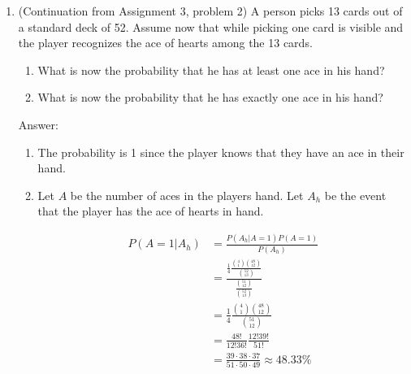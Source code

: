 \documentclass{article}
\begin{document}
\begin{enumerate}
\begin{enumerate}
\end{enumerate}

\item

(Continuation from Assignment 3, problem 2) A person picks 13 cards out of a standard deck of 52.  Assume now that while picking one card is visible and the player recognizes the ace of hearts among the 13 cards.

\begin{enumerate}
\item

What is now the probability that he has at least one ace in his hand?

\item

What is now the probability that he has exactly one ace in his hand?

\end{enumerate}

Answer:

\begin{enumerate}
\item The probability is 1 since the player knows that they have an ace in their hand.

\item Let $A$ be the number of aces in the players hand. Let $A_h$ be the event that the player has the ace of hearts in hand.

\begin{align*}
P(A = 1 | A_h) &= \frac{P(A_h | A = 1)P(A = 1)}{P(A_h)} \\
&= \frac{\frac{1}{4}\frac{\binom{4}{1}\binom{48}{12}}{\binom{52}{13}}}{\frac{\binom{51}{12}}{\binom{52}{13}}} \\
&= \frac{1}{4}\frac{\binom{4}{1}\binom{48}{12}}{\binom{51}{12}} \\
&= \frac{48!}{12!36!}\frac{12!39!}{51!} \\
&= \frac{39 \cdot 38 \cdot 37}{51 \cdot 50 \cdot 49} \approx 48.33\%
\end{align*}


\end{enumerate}

\end{enumerate}
\end{document}
